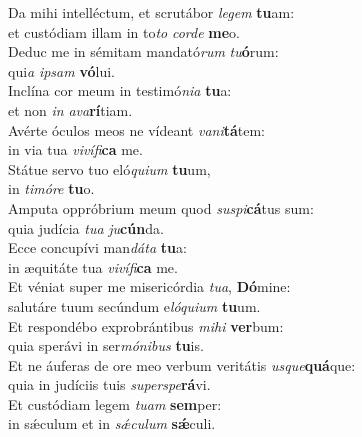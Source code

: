 \evenverse Da mihi intelléctum, et scrutábor \textit{le}\textit{gem} \textbf{tu}am:~\*\\
\evenverse et custódiam illam in to\textit{to} \textit{cor}\textit{de} \textbf{me}o.\\
\oddverse Deduc me in sémitam mandató\textit{rum} \textit{tu}\textbf{ó}rum:~\*\\
\oddverse qui\textit{a} \textit{i}\textit{psam} \textbf{vó}lui.\\
\evenverse Inclína cor meum in testimó\textit{ni}\textit{a} \textbf{tu}a:~\*\\
\evenverse et non \textit{in} \textit{a}\textit{va}\textbf{rí}tiam.\\
\oddverse Avérte óculos meos ne vídeant \textit{va}\textit{ni}\textbf{tá}tem:~\*\\
\oddverse in via tua \textit{vi}\textit{ví}\textit{fi}\textbf{ca} me.\\
\evenverse Státue servo tuo eló\textit{qui}\textit{um} \textbf{tu}um,~\*\\
\evenverse in \textit{ti}\textit{mó}\textit{re} \textbf{tu}o.\\
\oddverse Amputa oppróbrium meum quod \textit{su}\textit{spi}\textbf{cá}tus sum:~\*\\
\oddverse quia judícia \textit{tu}\textit{a} \textit{ju}\textbf{cún}da.\\
\evenverse Ecce concupívi man\textit{dá}\textit{ta} \textbf{tu}a:~\*\\
\evenverse in æquitáte tua \textit{vi}\textit{ví}\textit{fi}\textbf{ca} me.\\
\oddverse Et véniat super me misericórdia \textit{tu}\textit{a}, \textbf{Dó}mine:~\*\\
\oddverse salutáre tuum secúndum e\textit{ló}\textit{qui}\textit{um} \textbf{tu}um.\\
\evenverse Et respondébo exprobrántibus \textit{mi}\textit{hi} \textbf{ver}bum:~\*\\
\evenverse quia sperávi in ser\textit{mó}\textit{ni}\textit{bus} \textbf{tu}is.\\
\oddverse Et ne áuferas de ore meo verbum veritátis \textit{us}\textit{que}\textbf{quá}que:~\*\\
\oddverse quia in judíciis tuis \textit{su}\textit{per}\textit{spe}\textbf{rá}vi.\\
\evenverse Et custódiam legem \textit{tu}\textit{am} \textbf{sem}per:~\*\\
\evenverse in sǽculum et in \textit{sǽ}\textit{cu}\textit{lum} \textbf{sǽ}culi.\\
